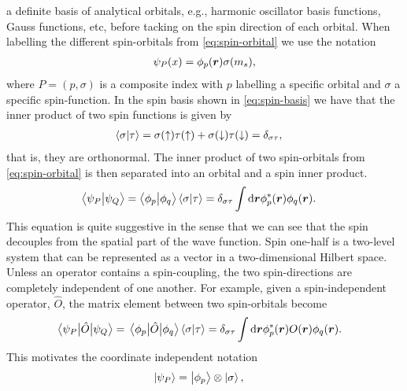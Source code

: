         a definite basis of analytical orbitals, e.g., harmonic oscillator basis
        functions, Gauss functions, etc, before tacking on the spin direction of
        each orbital.
        When labelling the different spin-orbitals from
        \autoref{eq:spin-orbital} we use the notation
        \begin{align}
            \psi_P(x) = \phi_p(\boldsymbol{r})\sigma(m_s),
        \end{align}
        where $P = (p, \sigma)$ is a composite index with $p$ labelling a
        specific orbital and $\sigma$ a specific spin-function.
        In the spin basis shown in \autoref{eq:spin-basis} we have that the
        inner product of two spin functions is given by
        \begin{align}
            \braket{\sigma}{\tau}
            &=
            \sigma(\uparrow)\tau(\uparrow)
            + \sigma(\downarrow)\tau(\downarrow)
            = \delta_{\sigma\tau},
        \end{align}
        that is, they are orthonormal.
        The inner product of two spin-orbitals from \autoref{eq:spin-orbital} is
        then separated into an orbital and a spin inner product.
        \begin{align}
            \braket{\psi_P}{\psi_Q}
            &= \braket{\phi_p}{\phi_q}\braket{\sigma}{\tau}
            = \delta_{\sigma\tau}
            \int\dd\boldsymbol{r}\phi^{*}_{p}(\boldsymbol{r})\phi_{q}(\boldsymbol{r}).
            \label{eq:inner-spin-orbital}
        \end{align}
        This equation is quite suggestive in the sense that we can see that the
        spin decouples from the spatial part of the wave function.
        Spin one-half is a two-level system that can be represented as a vector
        in a two-dimensional Hilbert space.
        Unless an operator contains a spin-coupling, the two spin-directions are
        completely independent of one another.
        For example, given a spin-independent operator, $\hat{O}$, the
        matrix element between two spin-orbitals become
        \begin{align}
            \mel{\psi_P}{\hat{O}}{\psi_Q}
            &= \mel{\phi_p}{\hat{O}}{\phi_q}\braket{\sigma}{\tau}
            = \delta_{\sigma\tau}
            \int\dd\boldsymbol{r}\phi^{*}_{p}(\boldsymbol{r})O(\boldsymbol{r})\phi_q(\boldsymbol{r}).
            \label{eq:example-spin-decoupling}
        \end{align}
        This motivates the coordinate independent notation
        \begin{align}
            \ket{\psi_P}
            &= \ket{\phi_p}\otimes\ket{\sigma},
        \end{align}
